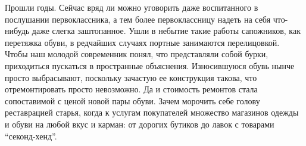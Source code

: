 Прошли годы. Сейчас вряд ли можно уговорить даже воспитанного в послушании
первоклассника, а тем более первоклассницу надеть на себя что-нибудь даже
слегка заштопанное. Ушли в небытие такие работы сапожников, как перетяжка
обуви, в редчайших случаях портные занимаются перелицовкой. Чтобы наш молодой
современник понял, что представляли собой бурки, приходиться пускаться в
пространные объяснения. Износившуюся обувь нынче просто выбрасывают, поскольку
зачастую ее конструкция такова, что отремонтировать просто невозможно. Да и
стоимость ремонтов стала сопоставимой с ценой новой пары обуви. Зачем морочить
себе голову реставрацией старья, когда к услугам покупателей множество
магазинов одежды и обуви на любой вкус и карман: от дорогих бутиков до лавок с
товарами \enquote{секонд-хенд}.
